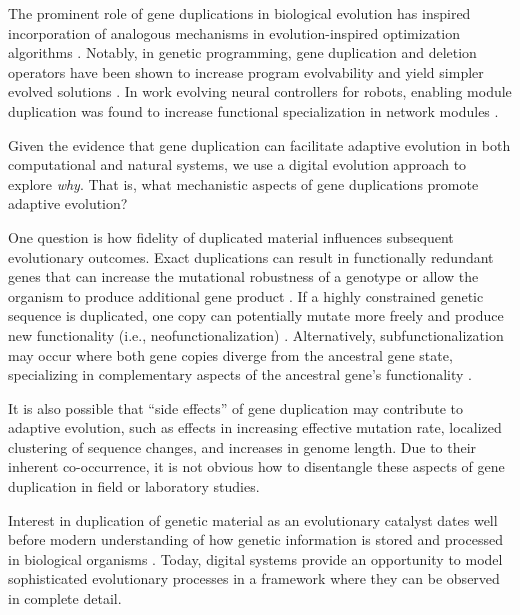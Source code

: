 The prominent role of gene duplications in biological evolution has inspired incorporation of analogous mechanisms in evolution-inspired optimization algorithms \citep{Ryan:1998gm,Sawai:1999genetic,Sawai:2000comparative,Schmitt:2005bc}.
Notably, in genetic programming, gene duplication and deletion operators have been shown to increase program evolvability and yield simpler evolved solutions \citep{Koza:1995fr}.
In work evolving neural controllers for robots, enabling module duplication was found to increase functional specialization in network modules \citep{Calabretta:1998vh,Calabretta:2000tl}.

Given the evidence that gene duplication can facilitate adaptive evolution in both computational and natural systems, we use a digital evolution approach to explore \textit{why}.
That is, what mechanistic aspects of gene duplications promote adaptive evolution?

One question is how fidelity of duplicated material influences subsequent evolutionary outcomes.
Exact duplications can result in functionally redundant genes that can increase the mutational robustness of a genotype \citep{Crow:2006role} or allow the organism to produce additional gene product \citep{Zhang:2003fw}.
If a highly constrained genetic sequence is duplicated, one copy can potentially mutate more freely and produce new functionality (i.e., neofunctionalization) \citep{Zhang:2003fw,Wagner:2003fk}.
Alternatively, subfunctionalization may occur where both gene copies diverge from the ancestral gene state, specializing in complementary aspects of the ancestral gene's functionality \citep{Zhang:2003fw}.

It is also possible that ``side effects'' of gene duplication may contribute to adaptive evolution, such as effects in increasing effective mutation rate, localized clustering of sequence changes, and increases in genome length.
Due to their inherent co-occurrence, it is not obvious how to disentangle these aspects of gene duplication in field or laboratory studies.

Interest in duplication of genetic material as an evolutionary catalyst dates well before modern understanding of how genetic information is stored and processed in biological organisms \citep{Metz:chromosomeDuplication1947}.
Today, digital systems provide an opportunity to model sophisticated evolutionary processes in a framework where they can be observed in complete detail.

